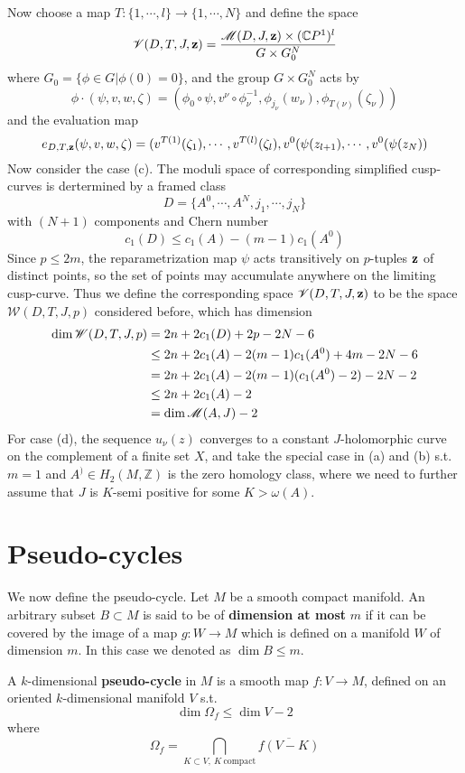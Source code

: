 \documentclass[twoside]{article}
\begin{document}
Now choose a map $T\colon \{1,\cdots,l\}\rightarrow \{1,\cdots,N\}$ and define the space
\[\mathscr{V}(D,T,J,\mathbf{z})=\frac{\mathscr{M}(D,J,\mathbf{z})\times (\mathbb{C}P^{1})^l}{G\times G^N_0}\]
where $G_0=\{\phi\in G |\phi(0)=0  \}$, and the group $G\times G^N_0$ acts by
\[\phi\cdot (\psi,v,w,\zeta)=(\phi_0\circ\psi,v^\nu\circ\phi_\nu^{-1},\phi_{j_\nu}(w_\nu),\phi_{T(\nu)}(\zeta_\nu))\]
and the evaluation map
\[e_{D,T,\mathbf{z}}(\psi,v,w,\zeta)=(v^{T(1)}(\zeta_1),\cdots,v^{T(l)}(\zeta_l),v^0(\psi(z_{l+1}),\cdots,v^0(\psi(z_N))\]
Now consider the case (c). The moduli space of corresponding simplified cusp-curves is dertermined by a framed class
\[D=\{A^0,\cdots,A^N,j_1,\cdots,j_N  \}\]
with $(N+1)$ components and Chern number
\[c_1(D)\leq c_1(A)-(m-1)c_1(A^0)\]
Since $p\leq 2m$, the reparametrization map $\psi$ acts transitively on $p$-tuples $\mathbf{z}$ of distinct points, 
so the set of points may accumulate anywhere on the limiting cusp-curve. 
Thus we define the corresponding space $\mathscr{V}(D,T,J,\mathbf{z})$ 
to be the space $\mathscr{W}(D,T,J,p)$ considered before, which has dimension 
\[ \begin{aligned}
\dim\mathscr{W}(D,T,J,p)&=2n+2c_1(D)+2p-2N-6\\
&\leq 2n+2c_1(A)-2(m-1)c_1(A^0)+4m-2N-6\\
&=2n+2c_1(A)-2(m-1)(c_1(A^0)-2)-2N-2\\
&\leq 2n+2c_1(A)-2\\
&=\dim\mathscr{M}(A,J)-2
\end{aligned} \]
For case (d), the sequence $u_\nu(z)$ converges to a constant $J$-holomorphic curve 
on the complement of a finite set $X$, and take the special case in (a) and (b) s.t. 
$m=1$ and $A^)\in H_2(M,\mathbb{Z})$ is the zero homology class, 
where we need to further assume that $J$ is $K$-semi positive for some $K>\omega(A)$.

\section{Pseudo-cycles}

We now define the pseudo-cycle. Let $M$ be a smooth compact manifold. 
An arbitrary subset $B\subset M$ is said to be of \textbf{dimension at most} $m$ 
if it can be covered by the image of a map $g\colon W\rightarrow M$ 
which is defined on a manifold $W$ of dimension $m$. 
In this case we denoted as $\dim B\leq m$.

A $k$-dimensional \textbf{pseudo-cycle} in $M$ is a smooth map $f\colon V\rightarrow M$, 
defined on an oriented $k$-dimensional manifold $V$ s.t. 
\[\dim \Omega_f\leq \dim V-2\]
where
\[\Omega_f=\bigcap_{K\subset V,\: K\: \textrm{compact}}\overline{f(V-K)}\]
\end{document}
